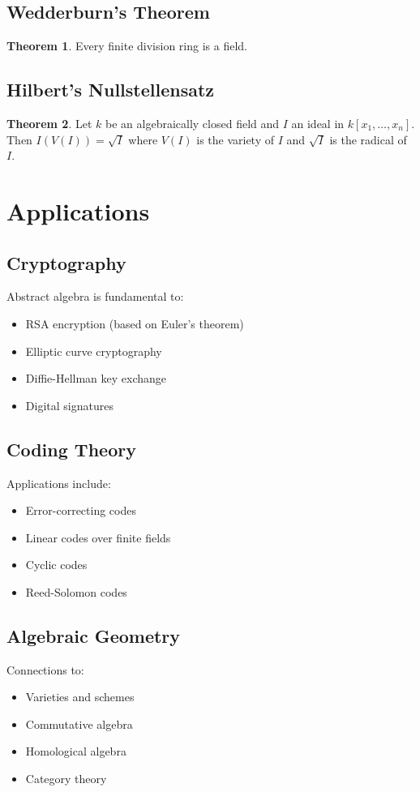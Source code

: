 \documentclass[11pt]{article}
\theoremstyle{definition}
\newtheorem{theorem}{Theorem}[section]
\begin{document}
\subsection{Wedderburn's Theorem}
\begin{theorem}
Every finite division ring is a field.
\end{theorem}

\subsection{Hilbert's Nullstellensatz}
\begin{theorem}
Let $k$ be an algebraically closed field and $I$ an ideal in $k[x_1, \ldots, x_n]$. Then $I(V(I)) = \sqrt{I}$ where $V(I)$ is the variety of $I$ and $\sqrt{I}$ is the radical of $I$.
\end{theorem}

\section{Applications}

\subsection{Cryptography}
Abstract algebra is fundamental to:
\begin{itemize}
    \item RSA encryption (based on Euler's theorem)
    \item Elliptic curve cryptography
    \item Diffie-Hellman key exchange
    \item Digital signatures
\end{itemize}

\subsection{Coding Theory}
Applications include:
\begin{itemize}
    \item Error-correcting codes
    \item Linear codes over finite fields
    \item Cyclic codes
    \item Reed-Solomon codes
\end{itemize}

\subsection{Algebraic Geometry}
Connections to:
\begin{itemize}
    \item Varieties and schemes
    \item Commutative algebra
    \item Homological algebra
    \item Category theory
\end{itemize}
\end{document}
